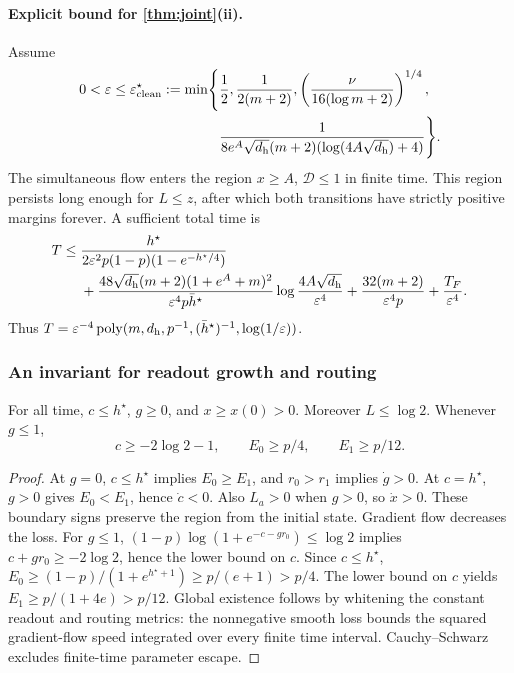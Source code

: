 \paragraph{Explicit bound for \cref{thm:joint}(ii).}
Assume
\begin{equation}
 \begin{aligned}
 0<\varepsilon\le\varepsilon^\star_{\mathrm{clean}}:=\min\Biggl\{&\frac12,\frac1{2(m+2)},
 \left(\frac{\nu}{16(\log m+2)}\right)^{1/4},\\
 &\frac1{8e^A\sqrt{d_{\mathrm h}}(m+2)(\log(4A\sqrt{d_{\mathrm h}})+4)}\Biggr\}.
 \end{aligned}
 \label{eq:CR-scale}
\end{equation}
The simultaneous flow enters the region $x\ge A$, $\mathcal D\le1$ in finite time. This region persists long enough for $L\le z$, after which both transitions have strictly positive margins forever. A sufficient total time is
\begin{align}
 T\le{}&\frac{h^\star}{2\varepsilon^2 p(1-p)(1-e^{-h^\star/4})}\notag\\
 &+\frac{48\sqrt{d_{\mathrm h}}(m+2)(1+e^A+m)^2}{\varepsilon^4p\bar h^\star}
       \log\frac{4A\sqrt{d_{\mathrm h}}}{\varepsilon^4}
 +\frac{32(m+2)}{\varepsilon^4p}+\frac{T_F}{\varepsilon^4}.\label{eq:CR-time}
\end{align}
Thus $T=\varepsilon^{-4}\operatorname{poly}(m,d_{\mathrm h},p^{-1},(\bar h^\star)^{-1},\log(1/\varepsilon))$.

\subsubsection{An invariant for readout growth and routing}
\begin{lemma}
\label{lem:CR-align}
For all time, $c\le h^\star$, $g\ge0$, and $x\ge x(0)>0$. Moreover $L\le\log2$. Whenever $g\le1$,
\[
 c\ge-2\log2-1,\qquad E_0\ge p/4,\qquad E_1\ge p/12.
\]
\end{lemma}
\begin{proof}
At $g=0$, $c\le h^\star$ implies $E_0\ge E_1$, and $r_0>r_1$ implies $\dot g>0$.
At $c=h^\star$, $g>0$ gives $E_0<E_1$, hence $\dot c<0$. Also $L_a>0$ when $g>0$, so $\dot x>0$.
These boundary signs preserve the region from the initial state. Gradient flow decreases the loss.
For $g\le1$, $(1-p)\log(1+e^{-c-gr_0})\le\log2$ implies $c+gr_0\ge-2\log2$, hence the lower bound on $c$.
Since $c\le h^\star$,
$E_0\ge(1-p)/(1+e^{h^\star+1})\ge p/(e+1)>p/4$.
The lower bound on $c$ yields $E_1\ge p/(1+4e)>p/12$.
Global existence follows by whitening the constant readout and routing metrics: the nonnegative smooth loss bounds the squared gradient-flow speed integrated over every finite time interval. Cauchy--Schwarz excludes finite-time parameter escape.
\end{proof}

